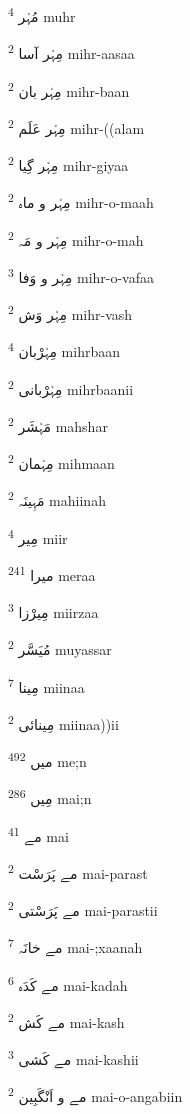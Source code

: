 \documentclass[12pt]{article}
\begin{document}
\begin{RTL}
\begin{multicols}{5}
{\ur مُہْر}   \textsuperscript{4} muhr

{\ur مِہْر آسا}   \textsuperscript{2} mihr-aasaa

{\ur مِہْر بان}   \textsuperscript{2} mihr-baan

{\ur مِہْر عَلَم}   \textsuperscript{2} mihr-((alam

{\ur مِہْر گِیا}   \textsuperscript{2} mihr-giyaa

{\ur مِہْر و ماہ}   \textsuperscript{2} mihr-o-maah

{\ur مِہْر و مَہ}   \textsuperscript{2} mihr-o-mah

{\ur مِہْر و وَفا}   \textsuperscript{3} mihr-o-vafaa

{\ur مِہْر وَش}   \textsuperscript{2} mihr-vash

{\ur مِہْرْبان}   \textsuperscript{4} mihrbaan

{\ur مِہْرْبانی}   \textsuperscript{2} mihrbaanii

{\ur مَہْشَر}   \textsuperscript{2} mahshar

{\ur مِہْمان}   \textsuperscript{2} mihmaan

{\ur مَہِینَہ}   \textsuperscript{2} mahiinah

{\ur مِیر}   \textsuperscript{4} miir

{\ur میرا}   \textsuperscript{241} meraa

{\ur مِیرْزا}   \textsuperscript{3} miirzaa

{\ur مُیَسَّر}   \textsuperscript{2} muyassar

{\ur مِینا}   \textsuperscript{7} miinaa

{\ur مِینائی}   \textsuperscript{2} miinaa))ii

{\ur میں}   \textsuperscript{492} me;n

{\ur مِیں}   \textsuperscript{286} mai;n

{\ur مے}   \textsuperscript{41} mai

{\ur مے پَرَسْت}   \textsuperscript{2} mai-parast

{\ur مے پَرَسْتی}   \textsuperscript{2} mai-parastii

{\ur مے خانَہ}   \textsuperscript{7} mai-;xaanah

{\ur مے کَدَہ}   \textsuperscript{6} mai-kadah

{\ur مے کَش}   \textsuperscript{2} mai-kash

{\ur مے کَشی}   \textsuperscript{3} mai-kashii

{\ur مے و اَنْگَبِین}   \textsuperscript{2} mai-o-angabiin


\end{multicols}
\end{RTL}
\end{document}

